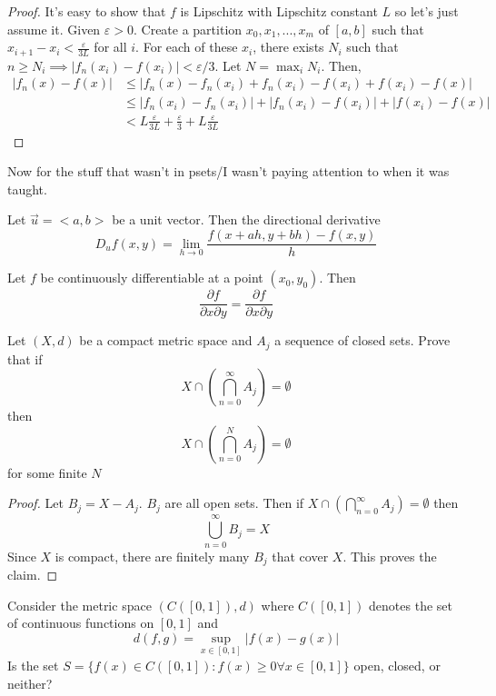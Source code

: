 \documentclass{article}
\newcommand{\eps}{\varepsilon}
\begin{document}
\begin{proof}
  It's easy to show that $f$ is Lipschitz with Lipschitz constant $L$ so let's just assume it. Given $\eps>0$. Create a partition $x_0,x_1,...,x_m$ of $[a,b]$ such that $x_{i+1}-x_i<\frac{\eps}{3L}$ for all $i$. For each of these $x_i$, there exists $N_i$ such that $n\geq N_i\implies |f_n(x_i)-f(x_i)|<\eps/3$. Let $N=\max_iN_i$. Then,
  \begin{equation*}
    \begin{split}
      |f_n(x)-f(x)| & \leq |f_n(x)-f_n(x_i)+f_n(x_i)-f(x_i)+f(x_i)-f(x)| \\
      & \leq |f_n(x_i)-f_n(x_i)|+|f_n(x_i)-f(x_i)|+|f(x_i)-f(x)| \\
      & < L\frac{\eps}{3L}+\frac{\eps}{3}+L\frac{\eps}{3L}
    \end{split}
  \end{equation*}
\end{proof}
Now for the stuff that wasn't in psets/I wasn't paying attention to when it was taught.
\begin{definition}
  Let $\vec u =<a,b>$ be a unit vector. Then the directional derivative
  $$
  D_uf(x,y)=\lim_{h\to0}\frac{f(x+ah,y+bh)-f(x,y)}{h}
  $$
\end{definition}
\begin{theorem}
  Let $f$ be continuously differentiable at a point $(x_0,y_0)$. Then
  $$
  \frac{\partial f}{\partial x\partial y}=\frac{\partial f}{\partial x\partial y}
  $$
\end{theorem}
\begin{problem}
  Let $(X,d)$ be a compact metric space and $A_j$ a sequence of closed sets. Prove that if
  $$
  X\cap(\bigcap_{n=0}^\infty A_j)=\emptyset
  $$
  then
  $$
  X\cap(\bigcap_{n=0}^N A_j)=\emptyset
  $$
  for some finite $N$
\end{problem}
\begin{proof}
  Let $B_j=X-A_j$. $B_j$ are all open sets. Then if $X\cap(\bigcap_{n=0}^\infty A_j)=\emptyset$ then
  $$
  \bigcup_{n=0}^\infty B_j=X
  $$
  Since $X$ is compact, there are finitely many $B_j$ that cover $X$. This proves the claim.
\end{proof}
\begin{problem}
  Consider the metric space $(C([0,1]),d)$ where $C([0,1])$ denotes the set of continuous functions on $[0,1]$ and
  $$
  d(f,g)=\sup_{x\in[0,1]}|f(x)-g(x)|
  $$
  Is the set $S=\{f(x)\in C([0,1]):f(x)\geq 0\forall x\in[0,1]\}$ open, closed, or neither?
\end{problem}
\end{document}
